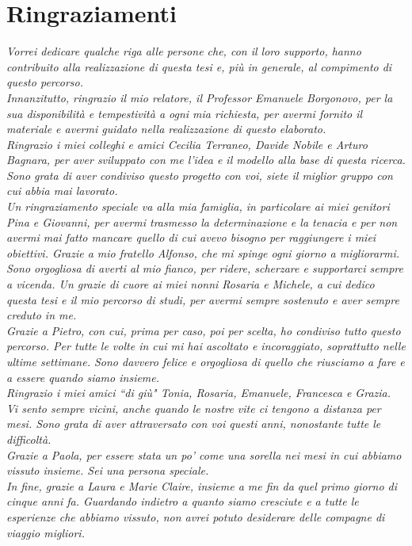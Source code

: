 \chapter*{Ringraziamenti}

\noindent \textit{Vorrei dedicare qualche riga alle persone che, con il loro supporto, hanno contribuito alla realizzazione di questa tesi e, più in generale, al compimento di questo percorso.} \\

\noindent \textit{Innanzitutto, ringrazio il mio relatore, il Professor Emanuele Borgonovo, per la sua disponibilità e tempestività a ogni mia richiesta, per avermi fornito il materiale e avermi guidato nella realizzazione di questo elaborato.} \\

\noindent \textit{Ringrazio i miei colleghi e amici Cecilia Terraneo, Davide Nobile e Arturo Bagnara, per aver sviluppato con me l'idea e il modello alla base di questa ricerca. Sono grata di aver condiviso questo progetto con voi, siete il miglior gruppo con cui abbia mai lavorato.} \\

\noindent \textit{Un ringraziamento speciale va alla mia famiglia, in particolare ai miei genitori Pina e Giovanni, per avermi trasmesso la determinazione e la tenacia e per non avermi mai fatto mancare quello di cui avevo bisogno per raggiungere i miei obiettivi. Grazie a mio fratello Alfonso, che mi spinge ogni giorno a migliorarmi. Sono orgogliosa di averti al mio fianco, per ridere, scherzare e supportarci sempre a vicenda. Un grazie di cuore ai miei nonni Rosaria e Michele, a cui dedico questa tesi e il mio percorso di studi, per avermi sempre sostenuto e aver sempre creduto in me.} \\

\noindent \textit{Grazie a Pietro, con cui, prima per caso, poi per scelta, ho condiviso tutto questo percorso. Per tutte le volte in cui mi hai ascoltato e incoraggiato, soprattutto nelle ultime settimane. Sono davvero felice e orgogliosa di quello che riusciamo a fare e a essere quando siamo insieme.} \\

\noindent \textit{Ringrazio i miei amici ``di giù" Tonia, Rosaria, Emanuele, Francesca e Grazia. Vi sento sempre vicini, anche quando le nostre vite ci tengono a distanza per mesi. Sono grata di aver attraversato con voi questi anni, nonostante tutte le difficoltà.} \\

\noindent \textit{Grazie a Paola, per essere stata un po' come una sorella nei mesi in cui abbiamo vissuto insieme. Sei una persona speciale.} \\

\noindent \textit{In fine, grazie a Laura e Marie Claire, insieme a me fin da quel primo giorno di cinque anni fa. Guardando indietro a quanto siamo cresciute e a tutte le esperienze che abbiamo vissuto, non avrei potuto desiderare delle compagne di viaggio migliori.}